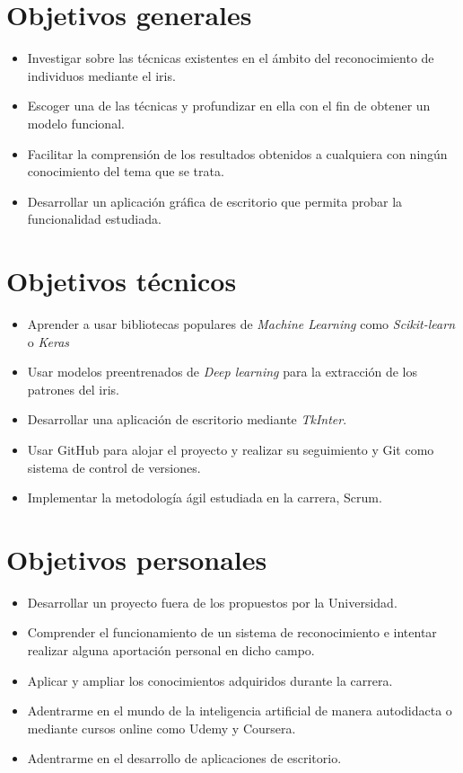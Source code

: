
\section{Objetivos generales}

\begin{itemize}
	\item Investigar sobre las técnicas existentes en el ámbito del reconocimiento de individuos mediante el iris.
	\item Escoger una de las técnicas y profundizar en ella con el fin de obtener un modelo funcional.
	\item Facilitar la comprensión de los resultados obtenidos a cualquiera con ningún conocimiento del tema que se trata.
	\item Desarrollar un aplicación gráfica de escritorio que permita probar la funcionalidad estudiada.
\end{itemize}

\section{Objetivos técnicos}

\begin{itemize}
	\item Aprender a usar bibliotecas populares de \emph{Machine Learning} como \emph{Scikit-learn} o \emph{Keras}
	\item Usar modelos preentrenados de \emph{Deep learning} para la extracción de los patrones del iris.
	\item Desarrollar una aplicación de escritorio mediante \emph{TkInter}.
	\item Usar GitHub para alojar el proyecto y realizar su seguimiento y Git como sistema de control de versiones.
	\item Implementar la metodología ágil estudiada en la carrera, Scrum.
\end{itemize}

\section{Objetivos personales}

\begin{itemize}
	\item Desarrollar un proyecto fuera de los propuestos por la Universidad.
	\item Comprender el funcionamiento de un sistema de reconocimiento e intentar realizar alguna aportación personal en dicho campo.
	\item Aplicar y ampliar los conocimientos adquiridos durante la carrera.
	\item Adentrarme en el mundo de la inteligencia artificial de manera autodidacta o mediante cursos online como Udemy y Coursera.
	\item Adentrarme en el desarrollo de aplicaciones de escritorio.
\end{itemize}